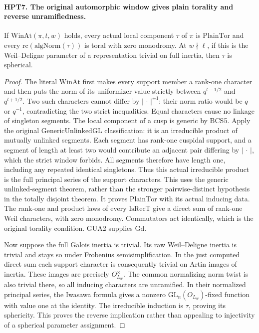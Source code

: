 \documentclass[11pt,a4paper]{article}
\numberwithin{equation}{section}
\theoremstyle{remark}\newtheorem{remark}[theorem]{Remark}
\begin{document}
\paragraph{HPT7. The original automorphic window gives plain torality and reverse unramifiedness.}
\label{claim:HPT7}
If $\mathrm{WinAt}(\pi,t,w)$ holds, every actual local component
$\tau$ of $\pi$ is $\mathrm{PlainTor}$ and every
$\mathrm{rc}(\mathrm{algNorm}(\tau))$ is toral with zero
monodromy.  At $w\nmid\ell$, if this is the Weil--Deligne
parameter of a representation trivial on full inertia, then
$\tau$ is spherical.
\begin{proof}
The literal $\mathrm{WinAt}$ first makes every support member a
rank-one character and then puts the norm of its uniformizer value
strictly between $q^{t-1/2}$ and $q^{t+1/2}$.  Two such characters
cannot differ by $|\,\cdot\,|^{\pm1}$: their norm ratio would be
$q$ or $q^{-1}$, contradicting the two strict inequalities.
Equal characters cause no linkage of singleton segments.
The local component of a cusp is generic by BCS5.  Apply the
original $\mathrm{GenericUnlinkedGL}$ classification: it is an
irreducible product of mutually unlinked segments.  Each segment
has rank-one cuspidal support, and a segment of length at least
two would contribute an adjacent pair differing by
$|\,\cdot\,|$, which the strict window forbids.  All segments
therefore have length one, including any repeated identical
singletons.  Thus this actual irreducible product is the full
principal series of the support characters.  This uses the
generic unlinked-segment theorem, rather than the stronger
pairwise-distinct hypothesis in the totally disjoint theorem.
It proves $\mathrm{PlainTor}$
with its actual inducing data.  The rank-one and product laws of
every $\mathrm{IsRecT}$ give a direct sum of rank-one Weil
characters, with zero monodromy.  Commutators act identically,
which is the original torality condition.  GUA2 supplies $\mathrm{Gd}$.

Now suppose the full Galois inertia is trivial.  Its raw
Weil--Deligne inertia is trivial and stays so under Frobenius
semisimplification.  In the just computed direct sum each support
character is consequently trivial on Artin images of inertia.
These images are precisely $O_{L_w}^\times$.  The common
normalizing norm twist is also trivial there, so all inducing
characters are unramified.  In their normalized principal series,
the Iwasawa formula gives a nonzero $\mathrm{GL}_n(O_{L_w})$-fixed
function with value one at the identity.  The irreducible induction
is $\tau$, proving its sphericity.  This proves the reverse
implication rather than appealing to injectivity of a spherical
parameter assignment.
\end{proof}
\end{document}
